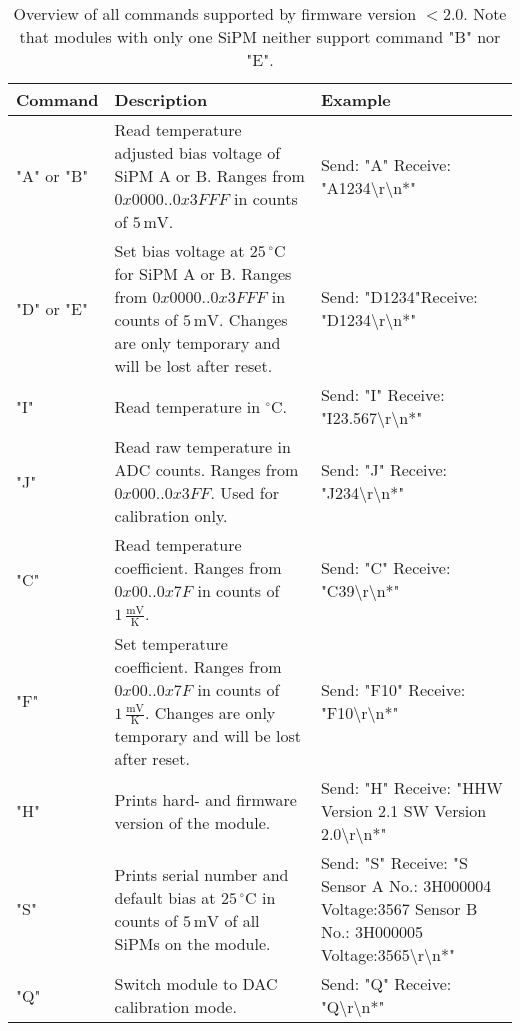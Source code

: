 \documentclass[]{article}
\begin{document}
	\begin{table}
		\begin{center}
			\begin{tabular}[]{|l||p{6cm}|p{4cm}|}
			\hline
			Command & Description & Example \\
			\hline
			"A" or "B" & Read temperature adjusted bias voltage of SiPM A or B. Ranges from $0x0000..0x3FFF$ in counts of $5\,\text{mV}$. & Send: "A"
			\newline Receive: "A1234\textbackslash r\textbackslash n*"\\
			\hline
			"D" or "E" & Set bias voltage at $25\,^{\circ} \text{C}$ for SiPM A or B. Ranges from $0x0000..0x3FFF$ in counts of $5\,\text{mV}$. Changes are only 
			temporary and will be lost after reset.& Send: "D1234"\newline Receive: "D1234\textbackslash r\textbackslash n*"\\
			\hline
			"I" & Read temperature in $^{\circ}\text{C}$. & Send: "I" \newline Receive: "I23.567\textbackslash r\textbackslash n*" \\
			\hline
			"J" & Read raw temperature in ADC counts. Ranges from $0x000..0x3FF$. Used for calibration only. & Send: "J" \newline Receive: "J234\textbackslash r\textbackslash n*" \\
			\hline
			"C" & Read temperature coefficient. Ranges from $0x00..0x7F$ in counts of $1\,\frac{\text{mV}}{\text{K}}$. & Send: "C" 
			\newline Receive: "C39\textbackslash r\textbackslash n*" \\
			\hline
			"F" & Set temperature coefficient. Ranges from $0x00..0x7F$ in counts of $1\,\frac{\text{mV}}{\text{K}}$. Changes are only temporary and 
			will be lost after reset. & Send: "F10" \newline Receive: "F10\textbackslash r\textbackslash n*" \\
			\hline
			"H" & Prints hard- and firmware version of the module. & Send: "H" \newline Receive: "HHW Version 2.1 SW Version 2.0\textbackslash r\textbackslash n*" \\
			\hline
			"S" & Prints serial number and default bias at $25\,^{\circ} \text{C}$ in counts of $5\, \text{mV}$ of all SiPMs on the module. &  Send: "S" 
			\newline Receive: "S Sensor A No.: 3H000004 Voltage:3567 Sensor B No.: 3H000005 Voltage:3565\textbackslash r\textbackslash n*" \\
			\hline
			"Q" & Switch module to DAC calibration mode. & Send: "Q" \newline Receive: "Q\textbackslash r\textbackslash n*" \\
			\hline
			\end{tabular}
		\end{center}
		\caption{Overview of all commands supported by firmware version $<2.0$. Note that modules with only one SiPM neither support command "B" nor "E".}
		\label{sipm_bus_table}
	\end{table}
\end{document}
